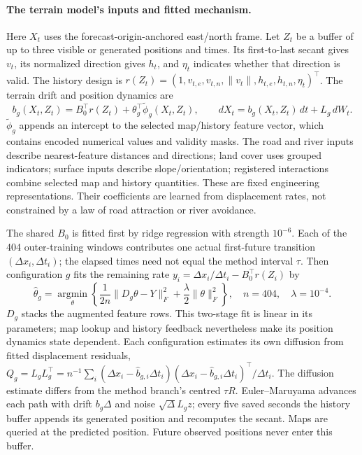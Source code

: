 \paragraph{The terrain model's inputs and fitted mechanism.}
Here $X_t$ uses the forecast-origin-anchored east/north frame.
Let $Z_t$ be a buffer of up to three visible or generated positions and
times. Its first-to-last secant gives $v_t$, its normalized direction
gives $h_t$, and $\eta_t$ indicates whether that direction is valid.
The history design is
$r(Z_t)=(1,v_{t,e},v_{t,n},\|v_t\|,h_{t,e},h_{t,n},\eta_t)^\top$.
The terrain drift and position dynamics are
\begin{equation}\label{eq:main-terrain-model}
 b_g(X_t,Z_t)=B_0^\top r(Z_t)+\theta_g^\top\widetilde\phi_g(X_t,Z_t),
 \qquad dX_t=b_g(X_t,Z_t)\,dt+L_g\,dW_t .
\end{equation}
$\widetilde\phi_g$ appends an intercept to the selected map/history
feature vector, which contains encoded numerical values and validity
masks. The road and river inputs describe nearest-feature distances and
directions; land cover uses grouped indicators; surface inputs describe
slope/orientation; registered interactions combine selected map and
history quantities. These are fixed engineering representations. Their
coefficients are learned from displacement rates, not constrained by a
law of road attraction or river avoidance.


The shared $B_0$ is fitted first by ridge regression with strength
$10^{-6}$. Each of the 404 outer-training windows contributes one actual
first-future transition $(\Delta x_i,\Delta t_i)$; the elapsed times need
not equal the method interval $\tau$. Then configuration $g$ fits the
remaining rate $y_i=\Delta x_i/\Delta t_i-B_0^\top r(Z_i)$ by
\begin{equation}\label{eq:main-terrain-fit}
 \widehat\theta_g=\underset{\theta}{\operatorname{argmin}}
 \left\{\frac1{2n}\|D_g\theta-Y\|_F^2+
             \frac\lambda2\|\theta\|_F^2\right\},
 \quad n=404,\quad\lambda=10^{-4} .
\end{equation}
$D_g$ stacks the augmented feature rows. This two-stage fit is linear in
its parameters; map lookup and history feedback nevertheless make its
position dynamics state dependent. Each configuration estimates its own
diffusion from fitted displacement residuals,
$Q_g=L_gL_g^\top=n^{-1}\sum_i
(\Delta x_i-\widehat b_{g,i}\Delta t_i)
(\Delta x_i-\widehat b_{g,i}\Delta t_i)^\top/\Delta t_i$.
The diffusion estimate differs from the method branch's centred $\tau R$.
Euler--Maruyama advances each path with drift $b_g\Delta$ and noise
$\sqrt\Delta L_gz$; every five saved seconds the history buffer appends
its generated position and recomputes the secant. Maps are queried at
the predicted position. Future observed positions never enter this buffer.

